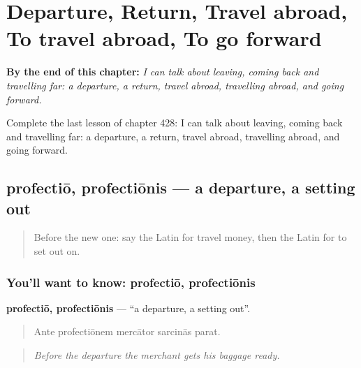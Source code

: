 
\chapter{Departure, Return, Travel abroad, To travel abroad, To go forward}
\label{ch:la-departure-return-travel-abroad-to-travel-abroad-to-go-forward}

\begin{chapteropening}
\textbf{By the end of this chapter:} \emph{I can talk about leaving, coming back and travelling far: a departure, a return, travel abroad, travelling abroad, and going forward.}

Complete the last lesson of chapter 428: I can talk about leaving, coming back and travelling far: a departure, a return, travel abroad, travelling abroad, and going forward.
\end{chapteropening}

\section[profectiō, profectiōnis]{profectiō, profectiōnis — a departure, a setting out}

\label{lesson:LA-C428-profectio}



\begin{quote}
Before the new one: say the Latin for travel money, then the Latin for to set out on.
\end{quote}

\subsection*{You'll want to know: profectiō, profectiōnis}
\textbf{profectiō, profectiōnis} — \textquotedblleft{}a departure, a setting out\textquotedblright{}.

\begin{quote}
Ante profectiōnem mercātor sarcinās parat.
\end{quote}

\begin{quote}
\emph{Before the departure the merchant gets his baggage ready.}
\end{quote}

